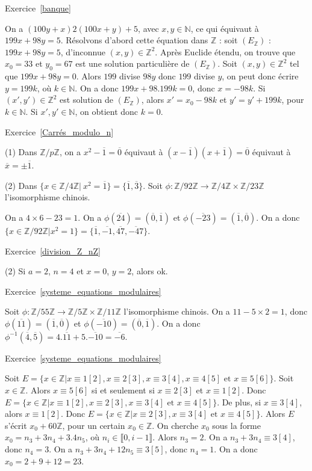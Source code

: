 \documentclass[11pt,a4paper]{article}
\newcommand{\N}{\mathbb{N}}
\newcommand{\Z}{\mathbb{Z}}
\begin{document}
Exercice~\ref{banque}

On a $(100 y +x) 2(100x+y)+5$, avec $x,y\in \N$, ce qui équivaut à $199x +98 y=5$. Résolvons d'abord cette équation dans $\Z$ : soit $(E_\Z)$ : $199x +98 y=5$, d'inconnue $(x,y)\in \Z^2$. Après Euclide étendu, on trouve que $x_0=33$ et $y_0=67$ est une solution particulière de $(E_\Z)$.  Soit $(x,y)\in \Z^2$ tel que $199x+98y=0$. Alors $199$ divise $98y$ donc $199$ divise $y$, on peut donc écrire $y=199 k$, où $k\in \N$. On a donc $199 x +98.199 k=0$, donc $x=-98k$. Si $(x',y')\in \Z^2$ est solution de $(E_\Z)$, alors $x'=x_0-98k$ et $y'=y'+199k$, pour $k\in \N$. Si $x',y'\in\N$, on obtient donc $k=0$. 

Exercice~\ref{Carrés_modulo_n}

(1) Dans $\Z/p\Z$, on a $x^2-\overline{1}=\overline{0}$ équivaut à $(x-\overline{1})(x+\overline{1})=\overline{0}$ équivaut à $\overline{x}=\pm \overline{1}$. 

(2) Dans $\{x\in \Z/4\Z|\ x^2=\overline{1}\}=\{\overline{1},\overline{3}\}$. Soit $\phi:\Z/92\Z\rightarrow \Z/4\Z\times \Z/23\Z$ l'isomorphisme chinois. 

On a $4\times 6-23=1$. On a $\phi(\overline{24})=(\overline{0},\overline{1})$ et $\phi(\overline{-23})=(\overline{1},\overline{0})$. On a donc $\{x\in \Z/92\Z|x^2=1\}=\{\overline{1},\overline{-1},\overline{47},\overline{-47}\}$. 

Exercice~\ref{division_Z_nZ}

(2) Si $a=2$, $n=4$ et $x=0$, $y=2$, alors ok.

Exercice~\ref{systeme_equations_modulaires}

Soit $\phi:\Z/55\Z\rightarrow \Z/5\Z\times \Z/11\Z$ l'isomorphisme chinois. On a $11-5\times 2=1$, donc $\phi(\overline{11})=(\overline{1},\overline{0})$ et $\phi(\overline{-10})=(\overline{0},\overline{1})$. On a donc $\phi^{-1}(\overline{4},\overline{5})=4.\overline{11}+5.\overline{-10}=\overline{-6}$.


Exercice~\ref{systeme_equations_modulaires}

Soit $E=\{x\in \Z|x\equiv1 [2], x\equiv 2[3], x\equiv 3[4], x\equiv 4[5]\text{ et }x\equiv 5[6]\}$. Soit $x\in \Z$. Alors $x\equiv 5[6]$ si et seulement si $x\equiv 2[3]$ et $x\equiv 1[2]$. Donc $E=\{x\in \Z|x\equiv1 [2], x\equiv 2[3], x\equiv 3[4]\text{ et } x\equiv 4[5]\}$. De plus, si $x\equiv 3[4]$, alors $x\equiv 1[2]$. Donc $E=\{x\in \Z| x\equiv 2[3], x\equiv 3[4] \text{ et }x\equiv 4[5]\}$. Alors $E$ s'écrit $x_0+60\Z$, pour un certain $x_0\in \Z$. On cherche $x_0$ sous la forme $x_0=n_3+3 n_4+3.4 n_5$, où $n_i\in \llbracket 0,i-1\rrbracket$. Alors $n_3=2$. On a $n_3+3n_4\equiv 3[4]$, donc $n_4=3$. On a $n_3+3n_4+12 n_5\equiv 3[5]$, donc $n_4=1$. On a donc $x_0=2+9+12=23$.
\end{document}

